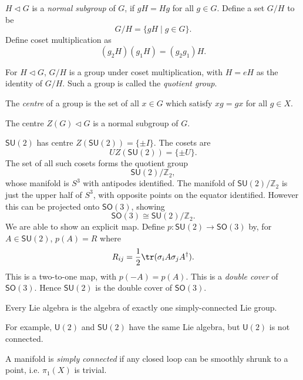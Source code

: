 \documentclass[12pt]{article}
\begin{document}
\begin{definition}
	$H \lhd G$ is a \emph{normal subgroup} of $G$, if $gH = Hg$ for all $g \in G$. Define a set $G/H$ to be
	\[
		G/H = \{g H \mid g \in G\}.
	\]
	Define coset multiplication as
	\[
		(g_2 H)(g_1 H) = (g_2 g_1)H.
	\]
\end{definition}

\begin{theorem}
	For $H \lhd G$, $G/H$ is a group under coset multiplication, with $H = eH$ as the identity of $G/H$. Such a group is called the \emph{quotient group}.
\end{theorem}


\begin{definition}
	The \emph{centre} of a group is the set of all $x \in G$ which satisfy $xg = gx$ for all $g \in X$.
\end{definition}

\begin{theorem}
	The centre $Z(G) \lhd G$ is a normal subgroup of $G$.
\end{theorem}

$\mathsf{SU}(2)$ has centre $Z(\mathsf{SU}(2)) = \{\pm I\}$. The cosets are
\[
	U Z(\mathsf{SU}(2)) = \{\pm U\}.
\]
The set of all such cosets forms the quotient group
\[
\mathsf{SU}(2) / \mathbb{Z}_2,
\]
whose manifold is $S^3$ with antipodes identified. The manifold of $\mathsf{SU}(2) / \mathbb{Z}_2$ is just the upper half of $S^3$, with opposite points on the equator identified. However this can be projected onto $\mathsf{SO}(3)$, showing
\[
\mathsf{SO}(3) \cong \mathsf{SU}(2) / \mathbb{Z}_2.
\]
We are able to show an explicit map. Define $p : \mathsf{SU}(2) \to \mathsf{SO}(3)$ by, for $A \in \mathsf{SU}(2)$, $p(A) = R$ where
\[
R_{ij} = \frac{1}{2} \tr(\sigma_i A \sigma_j A^{\dagger}).
\]
This is a two-to-one map, with $p(-A) = p(A)$. This is a \emph{double cover} of $\mathsf{SO}(3)$. Hence $\mathsf{SU}(2)$ is the double cover of $\mathsf{SO}(3)$.

\begin{proposition}
	Every Lie algebra is the algebra of exactly one simply-connected Lie group.
\end{proposition}

For example, $\mathsf{U}(2)$ and $\mathsf{SU}(2)$ have the same Lie algebra, but $\mathsf{U}(2)$ is not connected.

\begin{definition}
	A manifold is \emph{simply connected} if any closed loop can be smoothly shrunk to a point, i.e. $\pi_1(X)$ is trivial.
\end{definition}
\end{document}
